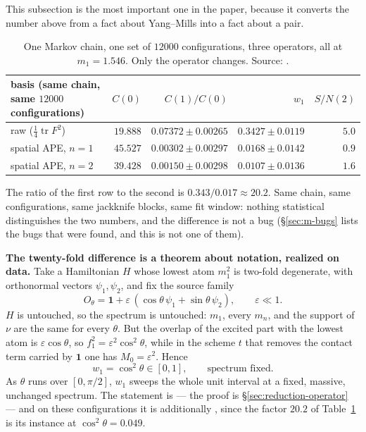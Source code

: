 This subsection is the most important one in the paper, because it converts the number above from a
fact about Yang--Mills into a fact about a pair.

\begin{table}[htbp]
\centering\small
\setlength{\tabcolsep}{5pt}
\begin{tabular}{@{}lrrrr@{}}
\toprule
basis (same chain, same $12000$ configurations) & $C(0)$ & $C(1)/C(0)$ & $w_1$ & $S/N(2)$ \\
\midrule
raw ($\tfrac14\operatorname{tr}F^2$)      & $19.888$ & $0.07372\pm0.00265$ & $0.3427\pm0.0119$ & $5.0$ \\
spatial APE, $n=1$                        & $45.527$ & $0.00302\pm0.00297$ & $0.0168\pm0.0142$ & $0.9$ \\
spatial APE, $n=2$                        & $39.428$ & $0.00150\pm0.00298$ & $0.0107\pm0.0136$ & $1.6$ \\
\bottomrule
\end{tabular}
\caption{One Markov chain, one set of $12000$ configurations, three operators, all at $m_1=1.546$.
Only the operator changes. Source: .}
\label{tab:m-bases}
\end{table}

The ratio of the first row to the second is $0.343/0.017\approx20.2$. Same chain, same
configurations, same jackknife blocks, same fit window: nothing statistical distinguishes the two
numbers, and the difference is not a bug (\S\ref{sec:m-bugs} lists the bugs that were found, and this
is not one of them).

\begin{v3box}
\textbf{The twenty-fold difference is a theorem about notation, realized on data.} Take a
Hamiltonian $H$ whose lowest atom $m_1^2$ is two-fold degenerate, with orthonormal vectors
$\psi_1,\psi_2$, and fix the source family
\[
O_\theta=\mathbf 1+\varepsilon\,(\cos\theta\,\psi_1+\sin\theta\,\psi_2),
\qquad \varepsilon\ll1 .
\]
$H$ is untouched, so the spectrum is untouched: $m_1$, every $m_n$, and the support of $\nu$ are the
same for every $\theta$. But the overlap of the excited part with the lowest atom is
$\varepsilon\cos\theta$, so $f_1^2=\varepsilon^2\cos^2\theta$, while in the scheme $t$ that removes
the contact term carried by $\mathbf 1$ one has $M_0=\varepsilon^2$. Hence
\[
w_1=\cos^2\theta\in[0,1],
\qquad \text{spectrum fixed.}
\]
As $\theta$ runs over $[0,\pi/2]$, $w_1$ sweeps the whole unit interval at a fixed, massive,
unchanged spectrum. The statement is \LT{} --- the proof is \S\ref{sec:reduction-operator} --- and on
these configurations it is additionally \LE, since the factor $20.2$ of Table~\ref{tab:m-bases} is
its instance at $\cos^2\theta=0.049$.
\end{v3box}

